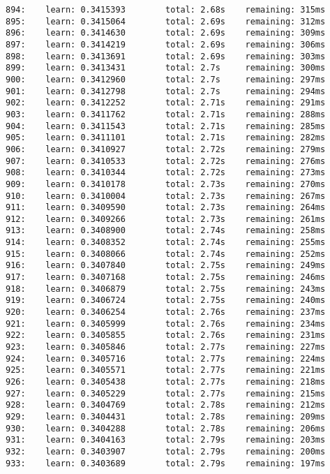 \documentclass[11pt]{article}
\begin{document}
\begin{Verbatim}[commandchars=\\\{\}]
894:    learn: 0.3415393        total: 2.68s    remaining: 315ms
895:    learn: 0.3415064        total: 2.69s    remaining: 312ms
896:    learn: 0.3414630        total: 2.69s    remaining: 309ms
897:    learn: 0.3414219        total: 2.69s    remaining: 306ms
898:    learn: 0.3413691        total: 2.69s    remaining: 303ms
899:    learn: 0.3413431        total: 2.7s     remaining: 300ms
900:    learn: 0.3412960        total: 2.7s     remaining: 297ms
901:    learn: 0.3412798        total: 2.7s     remaining: 294ms
902:    learn: 0.3412252        total: 2.71s    remaining: 291ms
903:    learn: 0.3411762        total: 2.71s    remaining: 288ms
904:    learn: 0.3411543        total: 2.71s    remaining: 285ms
905:    learn: 0.3411101        total: 2.71s    remaining: 282ms
906:    learn: 0.3410927        total: 2.72s    remaining: 279ms
907:    learn: 0.3410533        total: 2.72s    remaining: 276ms
908:    learn: 0.3410344        total: 2.72s    remaining: 273ms
909:    learn: 0.3410178        total: 2.73s    remaining: 270ms
910:    learn: 0.3410004        total: 2.73s    remaining: 267ms
911:    learn: 0.3409590        total: 2.73s    remaining: 264ms
912:    learn: 0.3409266        total: 2.73s    remaining: 261ms
913:    learn: 0.3408900        total: 2.74s    remaining: 258ms
914:    learn: 0.3408352        total: 2.74s    remaining: 255ms
915:    learn: 0.3408066        total: 2.74s    remaining: 252ms
916:    learn: 0.3407840        total: 2.75s    remaining: 249ms
917:    learn: 0.3407168        total: 2.75s    remaining: 246ms
918:    learn: 0.3406879        total: 2.75s    remaining: 243ms
919:    learn: 0.3406724        total: 2.75s    remaining: 240ms
920:    learn: 0.3406254        total: 2.76s    remaining: 237ms
921:    learn: 0.3405999        total: 2.76s    remaining: 234ms
922:    learn: 0.3405855        total: 2.76s    remaining: 231ms
923:    learn: 0.3405846        total: 2.77s    remaining: 227ms
924:    learn: 0.3405716        total: 2.77s    remaining: 224ms
925:    learn: 0.3405571        total: 2.77s    remaining: 221ms
926:    learn: 0.3405438        total: 2.77s    remaining: 218ms
927:    learn: 0.3405229        total: 2.77s    remaining: 215ms
928:    learn: 0.3404769        total: 2.78s    remaining: 212ms
929:    learn: 0.3404431        total: 2.78s    remaining: 209ms
930:    learn: 0.3404288        total: 2.78s    remaining: 206ms
931:    learn: 0.3404163        total: 2.79s    remaining: 203ms
932:    learn: 0.3403907        total: 2.79s    remaining: 200ms
933:    learn: 0.3403689        total: 2.79s    remaining: 197ms

\end{Verbatim}
\end{document}

